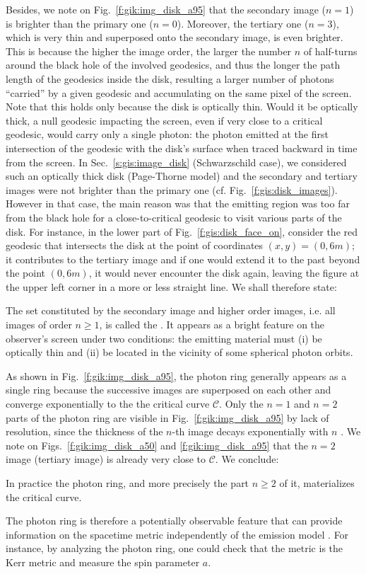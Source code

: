 Besides, we note on Fig.~\ref{f:gik:img_disk_a95}
that the secondary image ($n=1$) is brighter than the primary one ($n=0$). Moreover,
the tertiary one ($n=3$), which is very thin and superposed onto the secondary image,
is even brighter. This is because the higher the image order, the larger the
number $n$ of half-turns around the black hole of the involved geodesics,
and thus the longer the path length of the geodesics inside the disk, resulting
a larger number of photons ``carried'' by a given geodesic and accumulating on
the same pixel of the screen. Note that this holds only
because the disk is optically thin. Would it be optically thick, a null geodesic
impacting the screen, even if very close to a critical geodesic, would carry only a single photon: the photon emitted at the
first intersection of the geodesic with the disk's surface when traced backward in time from the screen.
In Sec.~\ref{s:gis:image_disk} (Schwarzschild case), we considered such an optically thick
disk (Page-Thorne model) and the secondary and tertiary images were not brighter than
the primary one (cf. Fig.~\ref{f:gis:disk_images}). However in that case, the main
reason was that the emitting region was too far from the black hole for a close-to-critical
geodesic to visit various parts of the disk. For instance, in the lower part of Fig.~\ref{f:gis:disk_face_on}, consider the red geodesic that intersects the disk
at the point of coordinates $(x,y) = (0, 6m)$; it contributes to
the tertiary image and if one would extend it to the past beyond the point $(0, 6m)$, it
would never encounter the disk again, leaving the figure at the upper left corner
in a more or less straight line. We shall therefore state:
\begin{prop}
The set constituted by the secondary image and higher order images, i.e. all images
of order $n\geq 1$, is called
the .
It appears as a bright feature on the observer's screen under two conditions:
the emitting material must (i) be optically
thin and (ii) be located in the vicinity of some spherical photon orbits.
\end{prop}
As shown
in Fig.~\ref{f:gik:img_disk_a95}, the photon ring generally appears as a single ring because
the successive images are superposed on each other and converge exponentially
to the the critical curve $\mathscr{C}$. Only the $n=1$ and $n=2$ parts of the photon ring
are visible in Fig.~\ref{f:gik:img_disk_a95} by lack of resolution, since
the thickness of the $n$-th image decays exponentially with $n$ \cite{GrallL20a}.
We note on Figs.~\ref{f:gik:img_disk_a50} and \ref{f:gik:img_disk_a95}
that the $n=2$ image (tertiary image) is already very close to $\mathscr{C}$.
We conclude:
\begin{prop}
In practice the photon ring, and more precisely the part $n\geq 2$ of it,
materializes the critical curve.
\end{prop}
The photon ring is therefore
a potentially observable feature that can provide information on the
spacetime metric independently of the emission model \cite{Johns_al20}.
For instance, by analyzing the photon ring, one could check that the metric is the Kerr metric and measure the spin parameter $a$.

